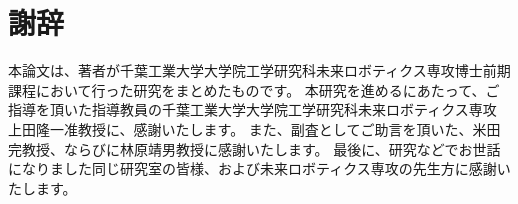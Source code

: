 \chapter*{謝辞}

本論文は、著者が千葉工業大学大学院工学研究科未来ロボティクス専攻博士前期課程において行った研究をまとめたものです。
本研究を進めるにあたって、ご指導を頂いた指導教員の千葉工業大学大学院工学研究科未来ロボティクス専攻 上田隆一准教授に、感謝いたします。
また、副査としてご助言を頂いた、米田完教授、ならびに林原靖男教授に感謝いたします。
最後に、研究などでお世話になりました同じ研究室の皆様、および未来ロボティクス専攻の先生方に感謝いたします。

